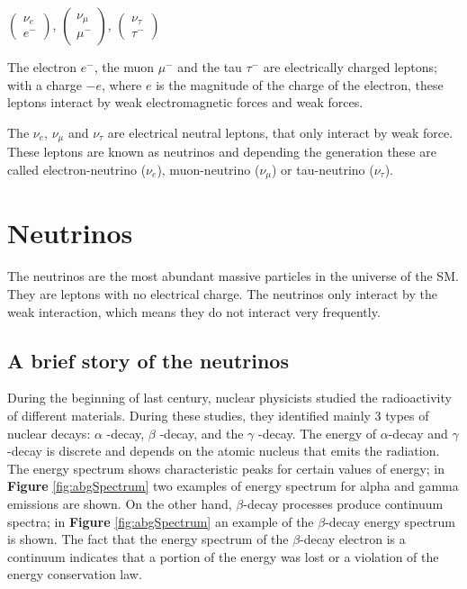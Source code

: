 $\begin{pmatrix}
    \nu_e \\
    e^-
\end{pmatrix}$, 
$\begin{pmatrix}
    \nu_\mu \\
    \mu^-
\end{pmatrix}$, 
$\begin{pmatrix}
    \nu_\tau \\
    \tau^-
\end{pmatrix}$

The electron $e^-$, the muon $\mu^-$ and the tau $\tau^-$ are electrically charged leptons; with a charge $-e$, where $e$ is the magnitude of the charge of the electron, these leptons interact by weak electromagnetic forces and weak forces. 

The $\nu_e$, $\nu_\mu$ and $\nu_\tau$ are electrical neutral leptons, that only interact by weak force. These leptons are known as neutrinos and depending the generation these are called electron-neutrino ($\nu_e$), muon-neutrino ($\nu_\mu$) or tau-neutrino ($\nu_\tau$). 

\section{Neutrinos}
The neutrinos are the most abundant massive particles in the universe of the SM. They are leptons with no electrical charge. The neutrinos only interact by the weak interaction, which means they do not interact very frequently. 

\subsection{A brief story of the neutrinos}
During the beginning of last century, nuclear physicists studied the radioactivity of different materials. During these studies, they identified mainly 3 types of nuclear decays: $\alpha$ -decay, $\beta$ -decay, and the $\gamma$ -decay. The energy of $\alpha$-decay and $\gamma$-decay is discrete and depends on the atomic nucleus that emits the radiation. The energy spectrum shows characteristic peaks for certain values of energy; in \textbf{Figure} \ref{fig:abgSpectrum} two examples of energy spectrum for alpha and gamma emissions are shown. On the other hand, $\beta$-decay processes produce continuum spectra; in \textbf{Figure} \ref{fig:abgSpectrum} an example of the $\beta$-decay energy spectrum is shown. The fact that the energy spectrum of the $\beta$-decay electron is a continuum indicates that a portion of the energy was lost or a violation of the energy conservation law.

